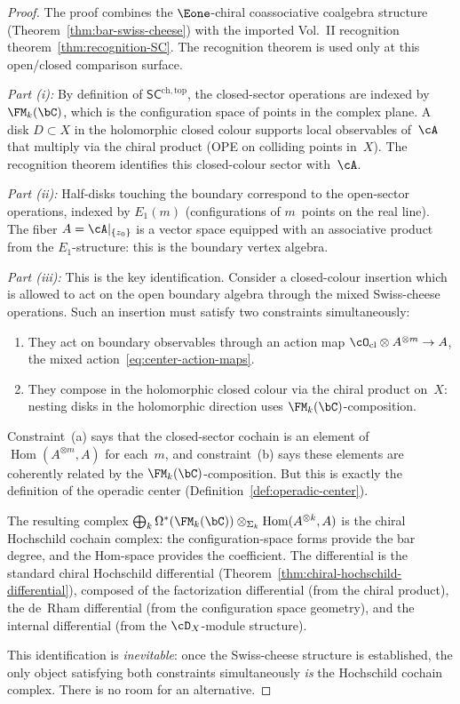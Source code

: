 \begin{proof}
The proof combines the $\Eone$-chiral coassociative coalgebra structure
(Theorem~\ref{thm:bar-swiss-cheese}) with the imported Vol.~II
recognition theorem~\ref{thm:recognition-SC}. The recognition theorem
is used only at this open/closed comparison surface.

\emph{Part (i):} By definition of $\mathsf{SC}^{\mathrm{ch,top}}$,
the closed-sector operations are indexed by $\FM_k(\bC)$, which is
the configuration space of points in the complex plane. A disk
$D \subset X$ in the holomorphic closed colour supports local
observables of~$\cA$ that multiply via the chiral product (OPE on
colliding points in~$X$). The recognition theorem identifies this
closed-colour sector with~$\cA$.

\emph{Part (ii):} Half-disks touching the boundary correspond to the
open-sector operations, indexed by $E_1(m)$ (configurations of
$m$~points on the real line). The fiber $A = \cA|_{\{z_0\}}$ is a
vector space equipped with an associative product from the
$E_1$-structure: this is the boundary vertex algebra.

\emph{Part (iii):}
This is the key identification. Consider a closed-colour insertion
which is allowed to act on the open boundary algebra through the
mixed Swiss-cheese operations. Such an insertion must satisfy two
constraints simultaneously:
\begin{enumerate}[label=\textup{(\alph*)}]
\item They act on boundary observables through an action map
 $\cO_{\mathrm{cl}} \otimes A^{\otimes m} \to A$, the mixed
 action~\eqref{eq:center-action-maps}.
\item They compose in the holomorphic closed colour via the chiral
 product on~$X$: nesting disks in the holomorphic direction uses
 $\FM_k(\bC)$-composition.
\end{enumerate}
Constraint~(a) says that the closed-sector cochain is an element of
$\operatorname{Hom}(A^{\otimes m}, A)$ for each~$m$, and
constraint~(b) says these elements are coherently related by the
$\FM_k(\bC)$-composition. But this is exactly the definition of
the operadic center (Definition~\ref{def:operadic-center}).

The resulting complex
$\bigoplus_k \Omega^*(\FM_k(\bC)) \otimes_{\Sigma_k}
\operatorname{Hom}(A^{\otimes k}, A)$
is the chiral Hochschild cochain complex: the
configuration-space forms provide the bar degree, and the
Hom-space provides the coefficient. The differential is the
standard chiral Hochschild differential
(Theorem~\ref{thm:chiral-hochschild-differential}),
composed of the factorization differential (from the chiral
product), the de~Rham differential (from the configuration space
geometry), and the internal differential (from the
$\cD_X$-module structure).

This identification is \emph{inevitable}: once the Swiss-cheese
structure is established, the only object satisfying both
constraints simultaneously \emph{is} the Hochschild cochain complex.
There is no room for an alternative.
\end{proof}

